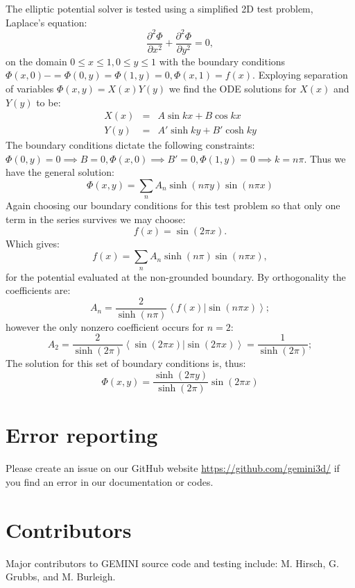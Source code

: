 \documentclass[11pt,letterpaper]{article}
\begin{document}
The elliptic potential solver is tested using a simplified 2D test problem, Laplace's equation:
\begin{equation}
\frac{\partial^2 \Phi}{\partial x^2} + \frac{\partial^2 \Phi}{\partial y^2} = 0, 
\end{equation}
on the domain $0 \le x \le 1, 0 \le y \le 1$ with the boundary conditions $\Phi(x,0)-=\Phi(0,y)=\Phi(1,y)=0, \Phi(x,1)=f(x)$.  Exploying separation of variables $\Phi(x,y)=X(x)Y(y)$ we find the ODE solutions for $X(x)$ and $Y(y)$ to be:
\begin{eqnarray}
X(x) &=& A \sin kx + B \cos kx \\
Y(y) &=& A' \sinh ky + B' \cosh ky
\end{eqnarray}
The boundary conditions dictate the following constraints:  $\Phi(0,y)=0 \implies B=0, \Phi(x,0) \implies B'=0, \Phi(1,y)=0 \implies k=n \pi$.  Thus we have the general solution:
\begin{equation}
\Phi(x,y) = \sum_n A_n \sinh (n \pi y) \sin (n \pi x)
\end{equation}
Again choosing our boundary conditions for this test problem so that only one term in the series survives we may choose:
\begin{equation}
f(x) = \sin(2 \pi x).
\end{equation}
Which gives:
\begin{equation}
f(x) = \sum_n A_n \sinh (n \pi) \sin (n \pi x),
\end{equation}
for the potential evaluated at the non-grounded boundary.  By orthogonality the coefficients are:  
\begin{equation}
A_n = \frac{2}{\sinh (n \pi)} \left< f(x) | \sin (n \pi x) \right>; 
\end{equation}
however the only nonzero coefficient occurs for $n=2$:
\begin{equation}
A_2 = \frac{2}{\sinh (2 \pi)} \left< \sin(2 \pi x) | \sin (2 \pi x) \right> = \frac{1}{\sinh(2 \pi)}; 
\end{equation}
The solution for this set of boundary conditions is, thus: 
\begin{equation}
\Phi(x,y) = \frac{\sinh (2 \pi y)}{\sinh(2 \pi)} \sin (2 \pi x)
\end{equation}


\section{Error reporting}

Please create an issue on our GitHub website \url{https://github.com/gemini3d/} if you find an error in our documentation or codes.  


\section{Contributors}

Major contributors to GEMINI source code and testing include:  M. Hirsch, G. Grubbs, and M. Burleigh.


\pagebreak

%
\end{document}
